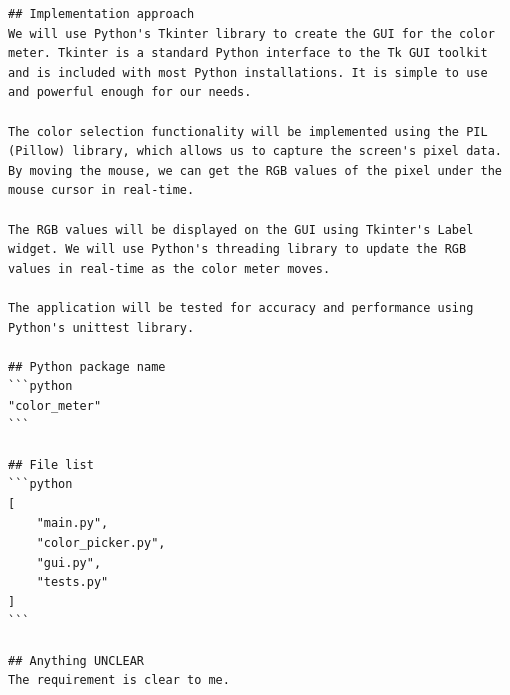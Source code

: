 \begin{tcolorbox}[title={\textbf{\small System design}}, colback=whitesmoke, 
colframe=royalblue(web), boxrule=2pt, arc=0mm]
{\scriptsize
\begin{lstlisting}[style=mystyle]
## Implementation approach
We will use Python's Tkinter library to create the GUI for the color meter. Tkinter is a standard Python interface to the Tk GUI toolkit and is included with most Python installations. It is simple to use and powerful enough for our needs.

The color selection functionality will be implemented using the PIL (Pillow) library, which allows us to capture the screen's pixel data. By moving the mouse, we can get the RGB values of the pixel under the mouse cursor in real-time.

The RGB values will be displayed on the GUI using Tkinter's Label widget. We will use Python's threading library to update the RGB values in real-time as the color meter moves.

The application will be tested for accuracy and performance using Python's unittest library.

## Python package name
```python
"color_meter"
```

## File list
```python
[
    "main.py",
    "color_picker.py",
    "gui.py",
    "tests.py"
]
```

## Anything UNCLEAR
The requirement is clear to me.
\end{lstlisting}
}
\end{tcolorbox}
